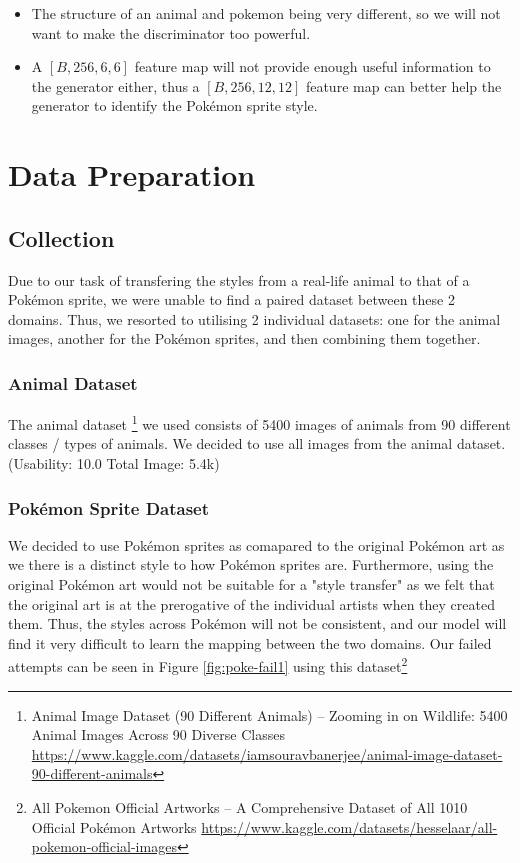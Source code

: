 \documentclass[twoside,english,notitlepage]{report}
\begin{document}
\begin{itemize}
    \item The structure of an animal and pokemon being very different, so we will not want to make the discriminator too powerful. 
    \item A $[B, 256, 6, 6]$ feature map will not provide enough useful information to the generator either, thus a $[B, 256, 12, 12]$ feature map can better help the generator to identify the Pokémon sprite style.
\end{itemize}

\newpage
\section{Data Preparation}
\subsection{Collection}
Due to our task of transfering the styles from a real-life animal to that of a Pokémon sprite, we were unable to find a paired dataset between these 2 domains. Thus, we resorted to utilising 2 individual datasets: one for the animal images, another for the Pokémon sprites, and then combining them together.

\subsubsection{Animal Dataset}
The animal dataset \footnote{Animal Image Dataset (90 Different Animals) – Zooming in on Wildlife: 5400 Animal Images Across 90 Diverse Classes \href{https://www.kaggle.com/datasets/iamsouravbanerjee/animal-image-dataset-90-different-animals}{https://www.kaggle.com/datasets/iamsouravbanerjee/animal-image-dataset-90-different-animals}} we used consists of 5400 images of animals from 90 different classes / types of animals. We decided to use all images from the animal dataset. (Usability: 10.0 Total Image: 5.4k)



\subsubsection{Pokémon Sprite Dataset}
We decided to use Pokémon sprites as comapared to the original Pokémon art as we there is a distinct style to how Pokémon sprites are. Furthermore, using the original Pokémon art would not be suitable for a "style transfer" as we felt that the original art is at the prerogative of the individual artists when they created them. Thus, the styles across Pokémon will not be consistent, and our model will find it very difficult to learn the mapping between the two domains. Our failed attempts can be seen in Figure \ref{fig:poke-fail1} using this dataset\footnote{All Pokemon Official Artworks – A Comprehensive Dataset of All 1010 Official Pokémon Artworks \href{https://www.kaggle.com/datasets/hesselaar/all-pokemon-official-images}{https://www.kaggle.com/datasets/hesselaar/all-pokemon-official-images}}
\end{document}
